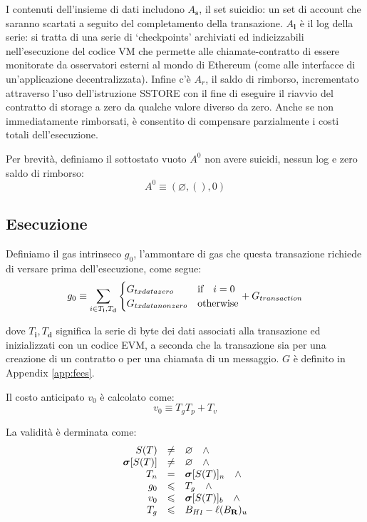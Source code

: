 \documentclass[9pt,oneside]{amsart}
\begin{document}
\begin{multicols}{2}
I contenuti dell'insieme di dati includono $A_\mathbf{s}$, il set suicidio: un set di account che saranno scartati a seguito del completamento della transazione. $A_\mathbf{l}$ è il log della serie: si tratta di una serie di `checkpoints' archiviati ed indicizzabili nell'esecuzione del codice VM che permette alle chiamate-contratto di essere monitorate da osservatori esterni al mondo di Ethereum (come alle interfacce di un'applicazione decentralizzata). Infine c'è $A_r$, il saldo di rimborso, incrementato attraverso l'uso dell'istruzione {\small SSTORE} con il fine di eseguire il riavvio del contratto di storage a zero da qualche valore diverso da zero. Anche se non immediatamente rimborsati, è consentito di compensare parzialmente i costi totali dell'esecuzione.

Per brevità, definiamo il sottostato vuoto $A^0$ non avere suicidi, nessun log e zero saldo di rimborso:
\begin{equation}
A^0 \equiv (\varnothing, (), 0)
\end{equation}

\subsection{Esecuzione}
Definiamo il gas intrinseco $g_0$, l'ammontare di gas che questa transazione richiede di versare prima dell'esecuzione, come segue:
\begin{equation}
g_0 \equiv \sum_{i \in T_\mathbf{i}, T_\mathbf{d}} \begin{cases} G_{txdatazero} & \text{if} \quad i = 0 \\ G_{txdatanonzero} & \text{otherwise} \end{cases} + G_{transaction}\\
\end{equation}

dove $T_\mathbf{i},T_\mathbf{d}$ significa la serie di byte dei dati associati alla transazione ed inizializzati con un codice EVM, a seconda che la transazione sia per una creazione di un contratto o per una chiamata di un messaggio. $G$ è definito in Appendix \ref{app:fees}.


Il costo anticipato $v_0$ è calcolato come:
\begin{equation}
v_0 \equiv T_g T_p + T_v
\end{equation}

La validità è derminata come:
\begin{equation}
\begin{array}[t]{rcl}
S(T) & \neq & \varnothing \quad \wedge \\
\boldsymbol{\sigma}[S(T)] & \neq & \varnothing \quad \wedge \\
T_n & = & \boldsymbol{\sigma}[S(T)]_n \quad \wedge \\
g_0 & \leqslant & T_g \quad \wedge \\ 
v_0 & \leqslant & \boldsymbol{\sigma}[S(T)]_b \quad \wedge \\
T_g & \leqslant & {B_H}_l - \ell(B_\mathbf{R})_u
\end{array}
\end{equation}


\end{multicols}
\end{document}
